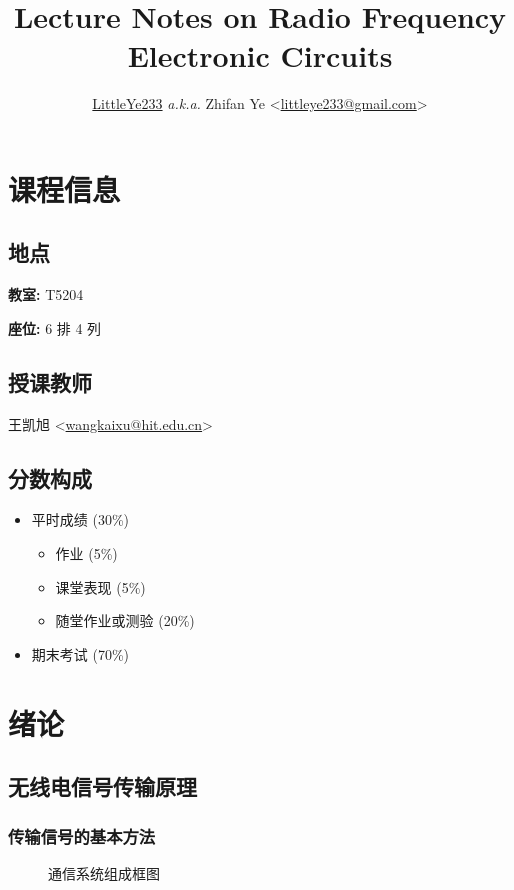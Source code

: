 \documentclass{notes}
\title{Lecture Notes on Radio Frequency Electronic Circuits}
\author{\href{https://github.com/LittleYe233}{LittleYe233} \textit{a.k.a.} Zhifan Ye <\href{mailto:littleye233@gmail.com}{littleye233@gmail.com}>}
\begin{document}
\maketitle
\tableofcontents
\newpage

\section*{课程信息} \label{课程信息}

\subsection{地点}
\textbf{教室:} T5204 \par
\textbf{座位:} 6 排 4 列

\subsection{授课教师}
王凯旭 <\href{mailto:wangkaixu@hit.edu.cn}{wangkaixu@hit.edu.cn}>

\subsection{分数构成}
\begin{itemize}
    \item 平时成绩 (30\%)
          \begin{itemize}
              \item 作业 (5\%)
              \item 课堂表现 (5\%)
              \item 随堂作业或测验 (20\%)
          \end{itemize}
    \item 期末考试 (70\%)
\end{itemize}

\section{绪论} \label{绪论}
\subsection{无线电信号传输原理}
\subsubsection{传输信号的基本方法}
\begin{figure}[ht]
    \centering
    \caption{通信系统组成框图}
\end{figure}
\end{document}
